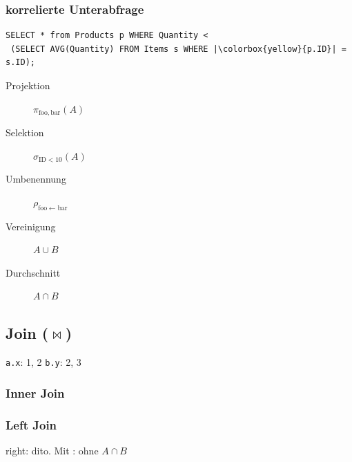 \begin{multicols*}{3}
\subsubsection{korrelierte Unterabfrage}

\begin{verbatim}
SELECT * from Products p WHERE Quantity <
 (SELECT AVG(Quantity) FROM Items s WHERE |\colorbox{yellow}{p.ID}| = s.ID);
\end{verbatim}

\begin{description}
\item[Projektion]{$\pi_{\mathrm{foo, bar}}(A)$ \\
    }
\item[Selektion]{$\sigma_{\mathrm{ID < 10}}(A)$ \\
    }
\item[Umbenennung]{$\rho_{\mathrm{foo} \leftarrow \mathrm{bar}}$ \\
  }
\item[Vereinigung]{$A \cup B$ \\
    }
\item[Durchschnitt]{$A \cap B$ \\
    }
\end{description}

\subsection{Join ($\bowtie$)}

\texttt{a.x}: 1, 2 \hspace{2em} \texttt{b.y}: 2, 3

\subsubsection{Inner Join}

\subsubsection{Left Join}
right: dito.
Mit : ohne $A \cap B$


\end{multicols*}
